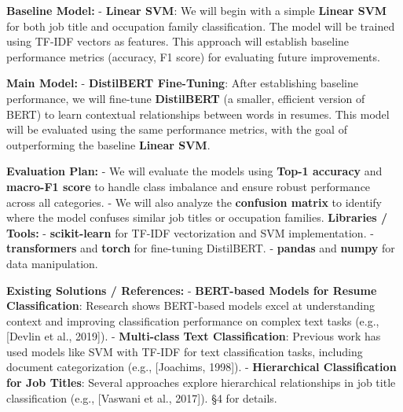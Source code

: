 \documentclass[12pt]{article}
\begin{document}
\medskip
\noindent \textbf{Baseline Model:}  
- \textbf{Linear SVM}: We will begin with a simple \textbf{Linear SVM} for both job title and occupation family classification. The model will be trained using TF-IDF vectors as features. This approach will establish baseline performance metrics (accuracy, F1 score) for evaluating future improvements.
 
\medskip
\noindent \textbf{Main Model:}  
- \textbf{DistilBERT Fine-Tuning}: After establishing baseline performance, we will fine-tune \textbf{DistilBERT} (a smaller, efficient version of BERT) to learn contextual relationships between words in resumes. This model will be evaluated using the same performance metrics, with the goal of outperforming the baseline \textbf{Linear SVM}.
 
\medskip
\noindent \textbf{Evaluation Plan:}  
- We will evaluate the models using \textbf{Top-1 accuracy} and \textbf{macro-F1 score} to handle class imbalance and ensure robust performance across all categories.
- We will also analyze the \textbf{confusion matrix} to identify where the model confuses similar job titles or occupation families.
\medskip
\noindent \textbf{Libraries / Tools:}  
- \textbf{scikit-learn} for TF-IDF vectorization and SVM implementation.
- \textbf{transformers} and \textbf{torch} for fine-tuning DistilBERT.
- \textbf{pandas} and \textbf{numpy} for data manipulation.
 
\medskip
\noindent \textbf{Existing Solutions / References:}  
- \textbf{BERT-based Models for Resume Classification}: Research shows BERT-based models excel at understanding context and improving classification performance on complex text tasks (e.g., [Devlin et al., 2019]).
- \textbf{Multi-class Text Classification}: Previous work has used models like SVM with TF-IDF for text classification tasks, including document categorization (e.g., [Joachims, 1998]).
- \textbf{Hierarchical Classification for Job Titles}: Several approaches explore hierarchical relationships in job title classification (e.g., [Vaswani et al., 2017]).
§4 for details.
\end{document}
